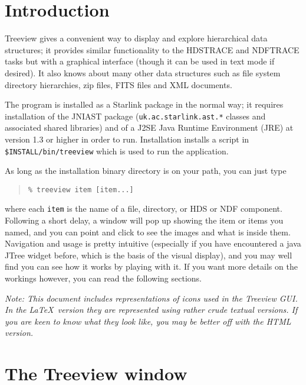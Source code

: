 \documentclass[twoside,11pt]{article}
\newenvironment{latexonly}{}{}
\newcommand{\xref}[3]{#1}
\newcommand{\xlabel}[1]{}
\renewcommand{\_}{\texttt{\symbol{95}}}
\begin{document}

\section{Introduction\xlabel{introduction}}

Treeview gives a convenient way to display and explore 
hierarchical data structures;  
it provides similar functionality to the \xref{HDSTRACE}{sun102}{}
and \xref{NDFTRACE}{sun95}{NDFTRACE} tasks but with a graphical 
interface (though it can be used in text mode if desired).
It also knows about 
many other data structures such as file system directory
hierarchies, zip files, FITS files and XML documents.

The program is installed as a Starlink package in the normal way;
it requires installation of the JNIAST package 
(\texttt{uk.ac.starlink.ast.*} classes and associated shared libraries)
and of a J2SE Java
Runtime Environment (JRE) at version 1.3 or higher in order to run.
Installation installs a script in \texttt{\$INSTALL/bin/treeview}
which is used to run the application.

As long as the installation binary directory is on your path, 
you can just type
\begin{quote}
\begin{verbatim}
% treeview item [item...]
\end{verbatim}
\end{quote}
where each \texttt{item} is the name of a file, directory, or HDS or NDF 
component.
Following a short delay, a window will pop up showing the item or
items you named, and you can point and click to see the 
images and what is inside them.
Navigation and usage is pretty intuitive
(especially if you have encountered a java JTree widget before, which
is the basis of the visual display), and you may well find you can
see how it works by playing with it.
If you want more details on the workings however, 
you can read the following sections.
\begin{latexonly}

\it Note: 
This document includes representations of icons used in the Treeview GUI.
In the \LaTeX\ version they are represented using rather crude textual
versions.  If you are keen to know what they look like, you may be
better off with the HTML version.
\end{latexonly}

\section{The Treeview window}
\end{document}
